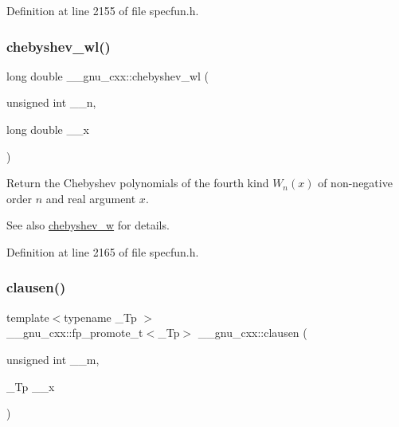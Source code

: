 Definition at line 2155 of file specfun.\+h.

\mbox{\label{group__gnu__math__spec__func_ga1297dfd9b9a0f584435de7d83eb9e9c3}} 
\subsubsection{\texorpdfstring{chebyshev\+\_\+wl()}{chebyshev\_wl()}}
{\footnotesize\ttfamily long double \+\_\+\+\_\+gnu\+\_\+cxx\+::chebyshev\+\_\+wl (\begin{DoxyParamCaption}\item[{unsigned int}]{\+\_\+\+\_\+n,  }\item[{long double}]{\+\_\+\+\_\+x }\end{DoxyParamCaption})\hspace{0.3cm}{\ttfamily [inline]}}

Return the Chebyshev polynomials of the fourth kind $ W_n(x) $ of non-\/negative order $ n $ and real argument $ x $.

\begin{DoxySeeAlso}{See also}
\hyperlink{group__gnu__math__spec__func_gaa156c6c21e99104ebcb627e92aceada0}{chebyshev\+\_\+w} for details. 
\end{DoxySeeAlso}


Definition at line 2165 of file specfun.\+h.

\mbox{\label{group__gnu__math__spec__func_ga54e4ba71b1f81718d6998349f91ff88f}} 
\subsubsection{\texorpdfstring{clausen()}{clausen()}\hspace{0.1cm}{\footnotesize\ttfamily [1/2]}}
{\footnotesize\ttfamily template$<$typename \+\_\+\+Tp $>$ \\
\+\_\+\+\_\+gnu\+\_\+cxx\+::fp\+\_\+promote\+\_\+t$<$\+\_\+\+Tp$>$ \+\_\+\+\_\+gnu\+\_\+cxx\+::clausen (\begin{DoxyParamCaption}\item[{unsigned int}]{\+\_\+\+\_\+m,  }\item[{\+\_\+\+Tp}]{\+\_\+\+\_\+x }\end{DoxyParamCaption})\hspace{0.3cm}{\ttfamily [inline]}}

